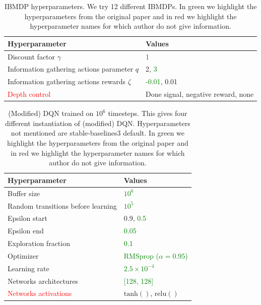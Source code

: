 \begin{table}
    \centering
    \caption{IBMDP hyperparameters. We try 12 different IBMDPs. In green we highlight the hyperparameters from the original paper and in red we highlight the hyperparameter names for which author do not give information.}\label{tab:ibmdp-params}
    \begin{tabular}{ll}
    \toprule
    \textbf{Hyperparameter} & \textbf{Values}\\
    \midrule
    Discount factor $\gamma$ & \textcolor{green}{1} \\
    Information gathering actions parameter $q$ & 2, \textcolor{green}{3} \\
    Information gathering actions rewards $\zeta$ & \textcolor{green}{-0.01}, 0.01 \\
    \textcolor{red}{Depth control} & Done signal, negative reward, none \\ 
    \bottomrule
    \end{tabular}
    \end{table}


\begin{table}
    \centering
    \caption{(Modified) DQN trained on $10^6$ timesteps. This gives four different instantiation of (modified) DQN. Hyperparameters not mentioned are stable-baselines3 default. In green we highlight the hyperparameters from the original paper and in red we highlight the hyperparameter names for which author do not give information.}\label{tab:ibmdp-rl1}
    \begin{tabular}{ll}
    \toprule
    \textbf{Hyperparameter} & \textbf{Values}\\
    \midrule
    Buffer size & \textcolor{green}{$10^6$} \\
    Random transitions before learning & \textcolor{green}{$10^5$} \\
    Epsilon start & 0.9, \textcolor{green}{0.5} \\
    Epsilon end & \textcolor{green}{0.05} \\
    Exploration fraction & \textcolor{green}{0.1} \\
    Optimizer & \textcolor{green}{RMSprop ($\alpha = 0.95$)}\\
    Learning rate & \textcolor{green}{$2.5\times10^{-4}$}\\
    Networks architectures & \textcolor{green}{[128, 128]}\\
    \textcolor{red}{Networks activations} & $\operatorname{tanh()}$, $\operatorname{relu()}$\\
    \bottomrule
    \end{tabular}
    \end{table}

